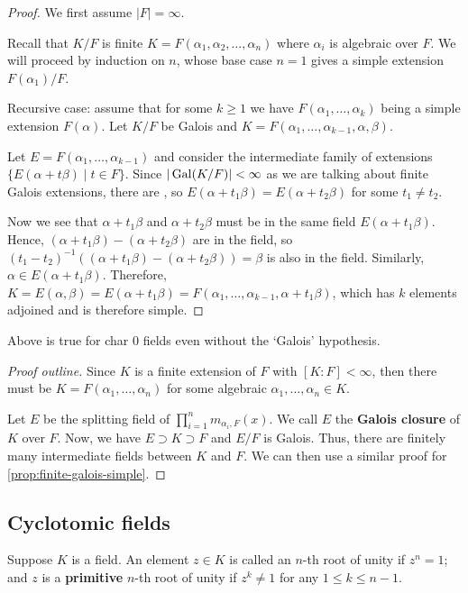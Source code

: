 \documentclass[12pt]{article}
\begin{document}
\begin{proof}
    We first assume $|F|=\infty$.

    Recall that $K/F$ is finite \ifnif $K=F(\alpha_1,\alpha_2,\dots,\alpha_n)$ where $\alpha_i$ is algebraic over $F$. We will proceed by induction on $n$, whose base case $n=1$ gives a simple extension $F(\alpha_1)/F$.

    Recursive case: assume that for some $k\geq 1$ we have $F(\alpha_1,\dots,\alpha_k)$ being a simple extension $F(\alpha)$. Let $K/F$ be Galois and $K=F(\alpha_1,\dots, \alpha_{k-1}, \alpha,\beta)$. 
    
    Let $E=F(\alpha_1,\dots, \alpha_{k-1})$ and consider the intermediate family of extensions $\{E(\alpha+t\beta)\mid t\in F\}$. Since $|\operatorname{Gal}(K/F)|<\infty$ as we are talking about finite Galois extensions, there are , so $E(\alpha+t_1\beta)=E(\alpha+t_2\beta)$ for some $t_1\neq t_2$.

    Now we see that $\alpha+t_1\beta$ and $\alpha+t_2\beta$ must be in the same field $E(\alpha+t_1\beta)$. Hence, $(\alpha+t_1\beta)-(\alpha+t_2\beta)$ are in the field, so $(t_1-t_2)^{-1}\left((\alpha+t_1\beta)-(\alpha+t_2\beta)\right)=\beta$ is also in the field. Similarly, $\alpha\in E(\alpha+t_1\beta)$. Therefore, $K=E(\alpha,\beta)=E(\alpha+t_1\beta)=F(\alpha_1,\dots,\alpha_{k-1}, \alpha+t_1\beta)$, which has $k$ elements adjoined and is therefore simple.
\end{proof}

\rmk Above is true for char 0 fields even without the `Galois' hypothesis.
\begin{proof}[Proof outline]
    Since $K$ is a finite extension of $F$ with $[K:F]<\infty$, then there must be $K=F(\alpha_1,\dots,\alpha_n)$ for some algebraic $\alpha_1,\dots,\alpha_n\in K$.

    Let $E$ be the splitting field of $\prod_{i=1}^{n}m_{\alpha_i,F}(x)$. We call $E$ the \textbf{Galois closure} of $K$ over $F$. Now, we have $E\supset K \supset F$ and $E/F$ is Galois. Thus, there are finitely many intermediate fields between $K$ and $F$. We can then use a similar proof for \cref{prop:finite-galois-simple}.
\end{proof}

\subsection{Cyclotomic fields}
 {}Suppose $K$ is a field. An element $z\in K$ is called an $n$-th root of unity if $z^n=1$; and $z$ is a \textbf{primitive} $n$-th root of unity if $z^k\neq 1$ for any $1\leq k\leq n-1$.
\end{document}
